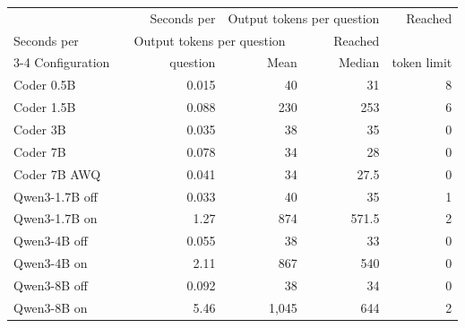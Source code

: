 \begin{tabular}{@{}l rrrr@{}}
\toprule
  & Seconds per & \multicolumn{2}{c}{Output tokens per question} & Reached \\ Seconds per & \multicolumn{2}{c}{Output tokens per question} & Reached \\
\cmidrule(lr){3-4}
Configuration & question & Mean & Median & token limit \\
\midrule
Coder 0.5B & 0.015 & 40 & 31 & 8 \\
Coder 1.5B & 0.088 & 230 & 253 & 6 \\
Coder 3B & 0.035 & 38 & 35 & 0 \\
Coder 7B & 0.078 & 34 & 28 & 0 \\
Coder 7B AWQ & 0.041 & 34 & 27.5 & 0 \\
\midrule
Qwen3-1.7B off & 0.033 & 40 & 35 & 1 \\
Qwen3-1.7B on & 1.27 & 874 & 571.5 & 2 \\
Qwen3-4B off & 0.055 & 38 & 33 & 0 \\
Qwen3-4B on & 2.11 & 867 & 540 & 0 \\
Qwen3-8B off & 0.092 & 38 & 34 & 0 \\
Qwen3-8B on & 5.46 & 1,045 & 644 & 2 \\
\bottomrule
\end{tabular}
